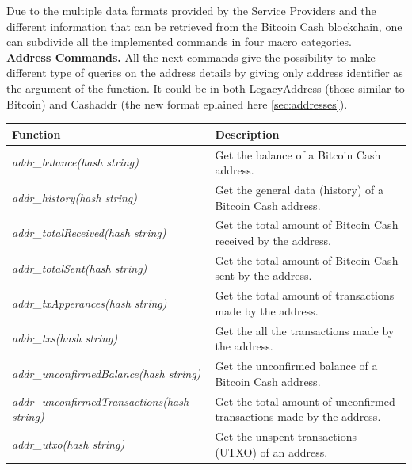 Due to the multiple data formats provided by the Service Providers and the 
different information that can be retrieved from the Bitcoin Cash blockchain, 
one can subdivide all the implemented commands in four macro categories.\medskip\\
\textbf{Address Commands.} All the next commands give the possibility to make different
type of queries on the address details by giving only address identifier as the argument
of the function. It could be in both LegacyAddress (those similar to Bitcoin) and Cashaddr
(the new format eplained here \ref{sec:addresses}).
\begin{table}[!ht]
    \centering
    \begin{tabular}{||l|p{6cm}||}
    \hline
    \textbf{Function}                          & \textbf{Description}                                                  \\ \hline
    \textit{addr\_balance(hash string)}                 & Get the balance of a Bitcoin Cash address.                            \\ \hline
    \textit{addr\_history(hash string)}                 & Get the general data (history) of a Bitcoin Cash address.             \\ \hline
    \textit{addr\_totalReceived(hash string)}           & Get the total amount of Bitcoin Cash received by the address.         \\ \hline
    \textit{addr\_totalSent(hash string)}               & Get the total amount of Bitcoin Cash sent by the address.             \\ \hline
    \textit{addr\_txApperances(hash string)}            & Get the total amount of transactions made by the address.             \\ \hline
    \textit{addr\_txs(hash string)}                     & Get the all the transactions made by the address.                     \\ \hline
    \textit{addr\_unconfirmedBalance(hash string)}      & Get the unconfirmed balance of a Bitcoin Cash address.                \\ \hline
    \textit{addr\_unconfirmedTransactions(hash string)} & Get the total amount of unconfirmed transactions made by the address. \\ \hline
    \textit{addr\_utxo(hash string)}                    & Get the unspent transactions (UTXO) of an address.                    \\ \hline
    \end{tabular}
    \end{table}\\
